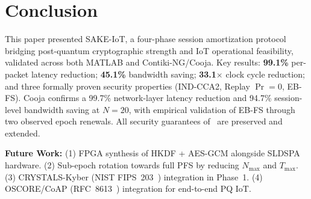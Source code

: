 \documentclass[runningheads]{llncs}
\newcommand{\Nmax}{N_{\max}}
\newcommand{\Tmax}{T_{\max}}
\begin{document}
\section{Conclusion}
\label{sec:conclusion}

This paper presented SAKE-IoT, a four-phase session amortization protocol
bridging post-quantum cryptographic strength and IoT operational feasibility,
validated across both MATLAB and Contiki-NG/Cooja. Key results:
\textbf{99.1\%} per-packet latency reduction; \textbf{45.1\%} bandwidth saving;
\textbf{33.1$\times$} clock cycle reduction; and three formally proven security
properties (IND-CCA2, Replay $\Pr{=}0$, EB-FS). Cooja confirms a 99.7\%
network-layer latency reduction and 94.7\% session-level bandwidth saving at
$N{=}20$, with empirical validation of EB-FS through two observed epoch renewals.
All security guarantees of~\cite{kumari2022} are preserved and extended.

\noindent\textbf{Future Work:}
(1) FPGA synthesis of HKDF + AES-GCM alongside SLDSPA hardware.
(2) Sub-epoch rotation towards full PFS by reducing $\Nmax$ and $\Tmax$.
(3) CRYSTALS-Kyber (NIST FIPS~203~\cite{fips203}) integration in Phase~1.
(4) OSCORE/CoAP (RFC~8613~\cite{rfc8613}) integration for end-to-end PQ IoT.
\end{document}
